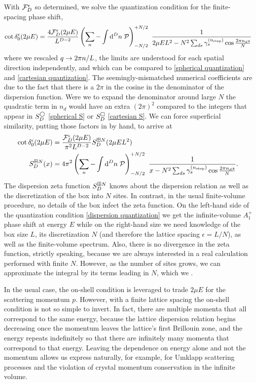 With $\mathcal{F}_D^\epsilon$ so determined, we solve the quantization condition for the finite-spacing phase shift,
\begin{align}
    \cot \delta_0^\epsilon(2\mu E)
    =
    \frac{4\mathcal{F}_D^\epsilon(2\mu E)}{L^{D-2}}
    \left(\sum_n - \int \mathrm{d}^D n\; \mathcal{P} \right)_{-N/2}^{+N/2}\  \frac{1}{2\mu E L^2 - N^2 \sum_{ds} \gamma^{({n_\text{step}})}_s \cos \frac{2\pi n_d s}{N}}
\end{align}
where we rescaled $q\rightarrow 2\pi n/L$, the limits are understood for each spatial direction independently, and which can be compared to \eqref{spherical quantization} and \eqref{cartesian quantization}.  The seemingly-mismatched numerical coefficients are due to the fact that there is a $2\pi$ in the cosine in the denominator of the dispersion function.
Were we to expand the denominator around large $N$ the quadratic term in $n_d$ would have an extra $(2\pi)^2$ compared to the integers that appear in $S^\bigcirc_D$ \eqref{spherical S} or $S^\square_D$ \eqref{cartesian S}.  We can force superficial similarity, putting those factors in by hand, to arrive at
\begin{align}
    \label{eq:dispersion quantization}
    \cot \delta_0^{\epsilon}( 2\mu E ) &= \frac{\mathcal{F}_D^\epsilon(2\mu E)}{\pi^2 L^{D-2}} S^{\boxplus N}_{D}(2\mu E L^2)
    \\
    \label{eq:dispersion S}
    S^{\boxplus N}_{D}( x )
    &=
    4\pi^2
    \left(\sum_n - \int \mathrm{d}^D n\; \mathcal{P} \right)_{-N/2}^{+N/2}\  \frac{1}{x - N^2 \sum_{ds} \gamma^{({n_\text{step}})}_s \cos \frac{2\pi n_d s}{N}}.
\end{align}
The dispersion zeta function $S^{\boxplus N}_{D}$ knows about the dispersion relation as well as the discretization of the box into $N$ sites.
In contrast, in the usual finite-volume procedure, no details of the box infect the zeta function.
On the left-hand side of the quantization condition \eqref{dispersion quantization} we get the infinite-volume $A_1^+$ phase shift at energy $E$ while on the right-hand size we need knowledge of the box size $L$, its discretization $N$ (and therefore the lattice spacing $\epsilon=L/N$), as well as the finite-volume spectrum.
Also, there is no divergence in the zeta function, strictly speaking, because we are always interested in a real calculation performed with finite $N$.
However, as the number of sites grows, we can approximate the integral by its terms leading in $N$, which we .

In the usual case, the on-shell condition is leveraged to trade $2\mu E$ for the scattering momentum $p$.  However, with a finite lattice spacing the on-shell condition is not so simple to invert.
In fact, there are multiple momenta that all correspond to the same energy, because the lattice dispersion relation begins decreasing once the momentum leaves the lattice's first Brillouin zone, and the energy repeats indefinitely so that there are infinitely many momenta that correspond to that energy.
Leaving the dependence on energy alone and not the momentum allows us express naturally, for example, for Umklapp scattering processes and the violation of crystal momentum conservation in the infinite volume.


